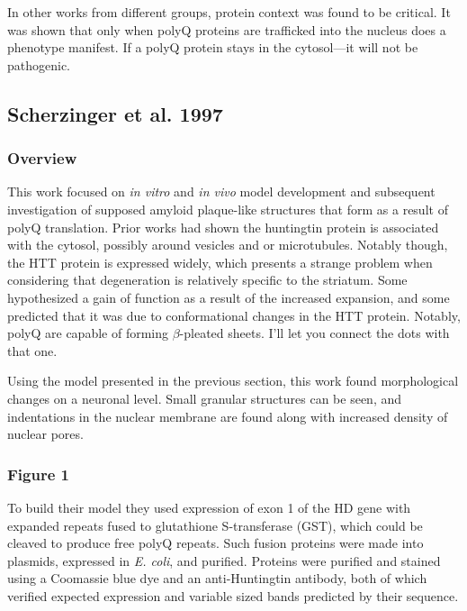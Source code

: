 \documentclass[12pt]{report}
\begin{document}
In other works from different groups, protein context was found to be critical. It was shown that only when polyQ proteins are trafficked into the nucleus does a phenotype manifest. If a polyQ protein stays in the cytosol---it will not be pathogenic.

\subsection{Scherzinger et al. 1997}

\subsubsection{Overview}

This work focused on \textit{in vitro} and \textit{in vivo} model development and subsequent investigation of supposed amyloid plaque-like structures that form as a result of polyQ translation. Prior works had shown the huntingtin protein is associated with the cytosol, possibly around vesicles and or microtubules. Notably though, the HTT protein is expressed widely, which presents a strange problem when considering that degeneration is relatively specific to the striatum. Some hypothesized a gain of function as a result of the increased expansion, and some predicted that it was due to conformational changes in the HTT protein. Notably, polyQ are capable of forming $\beta$-pleated sheets. I'll let you connect the dots with that one.\newline

Using the model presented in the previous section, this work found morphological changes on a neuronal level. Small granular structures can be seen, and indentations in the nuclear membrane are found along with increased density of nuclear pores. 

\subsubsection{Figure 1}

To build their model they used expression of exon 1 of the HD gene with expanded repeats fused to glutathione S-transferase (GST), which could be cleaved to produce free polyQ repeats. Such fusion proteins were made into plasmids, expressed in \textit{E. coli}, and purified. Proteins were purified and stained using a Coomassie blue dye and an anti-Huntingtin antibody, both of which verified expected expression and variable sized bands predicted by their sequence. 
\end{document}
